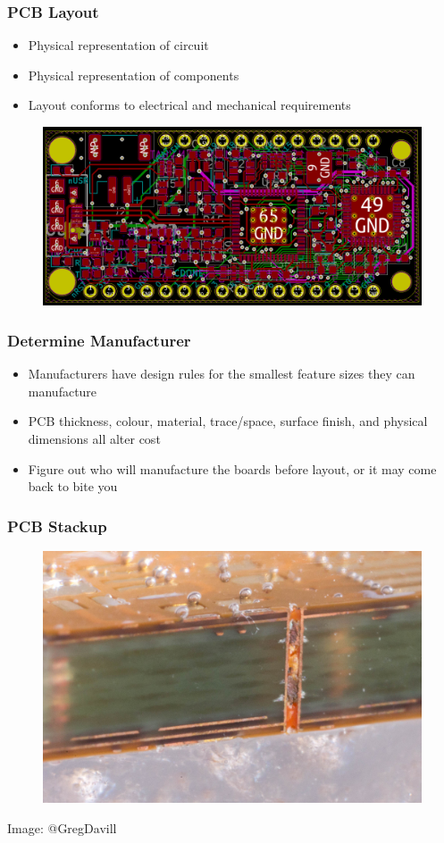 \documentclass[t]{beamer}
\begin{document}
\begin{frame}
\frametitle{PCB Layout}
\begin{itemize}
	\item Physical representation of circuit
	\item Physical representation of components 
	\item Layout conforms to electrical and mechanical requirements 
\end{itemize}
	
	\begin{figure}
		\includegraphics[width=0.9\linewidth]{ice40.png}
	\end{figure}

\end{frame}
\begin{frame}
\frametitle{Determine Manufacturer}
\begin{itemize}
	\item Manufacturers have design rules for the smallest feature sizes they can manufacture
	\item PCB thickness, colour, material, trace/space, surface finish, and physical dimensions all alter cost
	\item Figure out who will manufacture the boards before layout, or it may come back to bite you
\end{itemize}
\end{frame}
\begin{frame}
\frametitle{PCB Stackup}
\begin{figure}
	\includegraphics[width=0.8\linewidth]{crossSection2.jpg}
\end{figure}
Image: @GregDavill
\end{frame}
\end{document}
